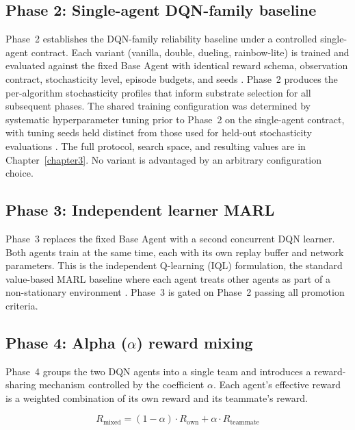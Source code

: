 \subsection{Phase 2: Single-agent DQN-family baseline}
\label{sec:phase2-methodology}
Phase~2 establishes the DQN-family reliability baseline under a controlled single-agent contract. Each variant (vanilla, double, dueling, rainbow-lite) is trained and evaluated against the fixed Base Agent with identical reward schema, observation contract, stochasticity level, episode budgets, and seeds \citep{henderson2018deep}. Phase~2 produces the per-algorithm stochasticity profiles that inform substrate selection for all subsequent phases. The shared training configuration was determined by systematic hyperparameter tuning prior to Phase~2 on the single-agent contract, with tuning seeds held distinct from those used for held-out stochasticity evaluations \citep{eimer2023hyperparameters}. The full protocol, search space, and resulting values are in Chapter~\ref{chapter3}. No variant is advantaged by an arbitrary configuration choice.

\subsection{Phase 3: Independent learner MARL}
\label{sec:phase3-methodology}

Phase~3 replaces the fixed Base Agent with a second concurrent DQN learner. Both agents train at the same time, each with its own replay buffer and network parameters. This is the independent Q-learning (IQL) formulation, the standard value-based MARL baseline where each agent treats other agents as part of a non-stationary environment \citep{foerster2017stabilising, hernandezleal2019survey}. Phase~3 is gated on Phase~2 passing all promotion criteria.

\subsection{Phase 4: Alpha ($\alpha$) reward mixing}
\label{sec:alpha-mixing}

Phase~4 groups the two DQN agents into a single team and introduces a reward-sharing mechanism controlled by the coefficient $\alpha$. Each agent's effective reward is a weighted combination of its own reward and its teammate's reward.

\[
R_{\text{mixed}} = (1 - \alpha) \cdot R_{\text{own}} + \alpha \cdot R_{\text{teammate}}
\]

